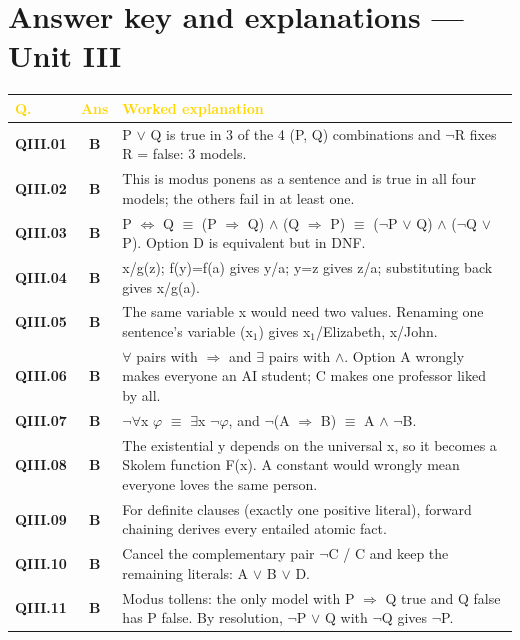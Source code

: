 \documentclass[11pt]{article}
\begin{document}
\section*{Answer key and explanations --- Unit III}
\begin{longtable}{>{\leavevmode\bfseries\color{navy}}p{1.3cm} c p{13.2cm}}
\rowcolor{navy}\textcolor{gold}{\textbf{Q.}}&\textcolor{gold}{\textbf{Ans}}&\textcolor{gold}{\textbf{Worked explanation}}\\\endhead
QIII.01&\textbf{\color{leaf}B}&P $\vee$ Q is true in 3 of the 4 (P, Q) combinations and $\neg$R fixes R = false: 3 models.\\
\rowcolor{ivory}QIII.02&\textbf{\color{leaf}B}&This is modus ponens as a sentence and is true in all four models; the others fail in at least one.\\
QIII.03&\textbf{\color{leaf}B}&P $\Leftrightarrow$ Q $\equiv$ (P $\Rightarrow$ Q) $\wedge$ (Q $\Rightarrow$ P) $\equiv$ ($\neg$P $\vee$ Q) $\wedge$ ($\neg$Q $\vee$ P). Option D is equivalent but in DNF.\\
\rowcolor{ivory}QIII.04&\textbf{\color{leaf}B}&x/g(z); f(y)=f(a) gives y/a; y=z gives z/a; substituting back gives x/g(a).\\
QIII.05&\textbf{\color{leaf}B}&The same variable x would need two values. Renaming one sentence's variable (x$_1$) gives {x$_1$/Elizabeth, x/John}.\\
\rowcolor{ivory}QIII.06&\textbf{\color{leaf}B}&$\forall$ pairs with $\Rightarrow$ and $\exists$ pairs with $\wedge$. Option A wrongly makes everyone an AI student; C makes one professor liked by all.\\
QIII.07&\textbf{\color{leaf}B}&$\neg$$\forall$x $\varphi$ $\equiv$ $\exists$x $\neg$$\varphi$, and $\neg$(A $\Rightarrow$ B) $\equiv$ A $\wedge$ $\neg$B.\\
\rowcolor{ivory}QIII.08&\textbf{\color{leaf}B}&The existential y depends on the universal x, so it becomes a Skolem function F(x). A constant would wrongly mean everyone loves the same person.\\
QIII.09&\textbf{\color{leaf}B}&For definite clauses (exactly one positive literal), forward chaining derives every entailed atomic fact.\\
\rowcolor{ivory}QIII.10&\textbf{\color{leaf}B}&Cancel the complementary pair $\neg$C / C and keep the remaining literals: A $\vee$ B $\vee$ D.\\
QIII.11&\textbf{\color{leaf}B}&Modus tollens: the only model with P $\Rightarrow$ Q true and Q false has P false. By resolution, $\neg$P $\vee$ Q with $\neg$Q gives $\neg$P.\\

\end{longtable}
\end{document}
